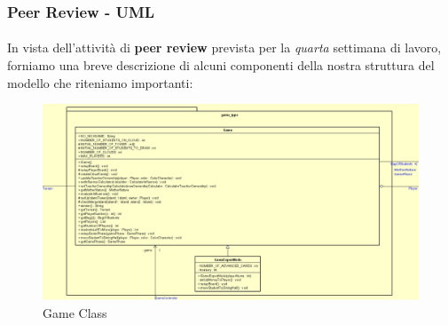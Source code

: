 \documentclass[a4paper, 12pt]{article}
\begin{document}
	\subsubsection{Peer Review - UML}
	\paragraph{}
	In vista dell'attività di \textbf{peer review} prevista per la \emph{quarta} settimana di lavoro, forniamo una breve descrizione di alcuni componenti della nostra struttura del modello che riteniamo importanti:\\
	\begin{figure}[h!]
		\centering
		\includegraphics[scale=0.50]{game class.png}
		\caption{Game Class}
	\end{figure}\\
\end{document}
